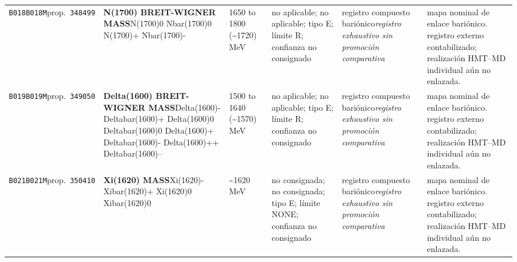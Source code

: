 \begin{landscape}
\begin{longtable}{L{1.85cm}L{4.45cm}L{2.35cm}L{4.05cm}L{3.35cm}L{7.15cm}}
\texttt{B018}\newline \texttt{B018M}\newline prop.\ \texttt{348499} & \textbf{N(1700) BREIT-WIGNER MASS}\newline N(1700)0 \textbar{}\allowbreak{} Nbar(1700)0 \textbar{}\allowbreak{} N(1700)+ \textbar{}\allowbreak{} Nbar(1700)- & 1650 to 1800 (\textasciitilde{}1720)\,MeV & no aplicable; no aplicable; tipo E; límite R; confianza no consignado & registro compuesto bariónico\newline \emph{registro exhaustivo sin promoción comparativa} & mapa nominal de enlace bariónico. registro externo contabilizado; realización HMT--MD individual aún no enlazada. \\
\texttt{B019}\newline \texttt{B019M}\newline prop.\ \texttt{349050} & \textbf{Delta(1600) BREIT-WIGNER MASS}\newline Delta(1600)- \textbar{}\allowbreak{} Deltabar(1600)+ \textbar{}\allowbreak{} Delta(1600)0 \textbar{}\allowbreak{} Deltabar(1600)0 \textbar{}\allowbreak{} Delta(1600)+ \textbar{}\allowbreak{} Deltabar(1600)- \textbar{}\allowbreak{} Delta(1600)++ \textbar{}\allowbreak{} Deltabar(1600)-- & 1500 to 1640 (\textasciitilde{}1570)\,MeV & no aplicable; no aplicable; tipo E; límite R; confianza no consignado & registro compuesto bariónico\newline \emph{registro exhaustivo sin promoción comparativa} & mapa nominal de enlace bariónico. registro externo contabilizado; realización HMT--MD individual aún no enlazada. \\
\texttt{B021}\newline \texttt{B021M}\newline prop.\ \texttt{350410} & \textbf{Xi(1620) MASS}\newline Xi(1620)- \textbar{}\allowbreak{} Xibar(1620)+ \textbar{}\allowbreak{} Xi(1620)0 \textbar{}\allowbreak{} Xibar(1620)0 & \textasciitilde{}1620\,MeV & no consignada; no consignada; tipo E; límite NONE; confianza no consignado & registro compuesto bariónico\newline \emph{registro exhaustivo sin promoción comparativa} & mapa nominal de enlace bariónico. registro externo contabilizado; realización HMT--MD individual aún no enlazada. \\

\end{longtable}
\end{landscape}
